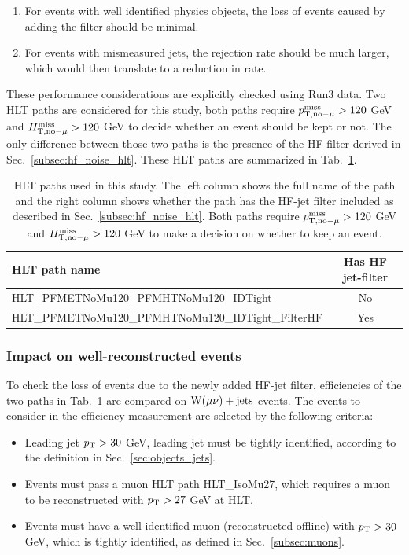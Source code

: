\begin{enumerate}
    \item For events with well identified physics objects, the loss of events caused by adding the filter should be minimal.
    \item For events with mismeasured jets, the rejection rate should be much larger, which would then translate to a reduction in rate.
\end{enumerate}

These performance considerations are explicitly checked using Run3 data. 
Two HLT paths are considered for this study, both paths require $p_{\textrm{T},\textrm{no}-\mu}^{\textrm{miss}} > 120$ GeV and $H_{\textrm{T},\textrm{no}-\mu}^{\textrm{miss}} > 120$ GeV
to decide whether an event should be kept or not. The only difference between those two paths is the presence of the HF-filter derived in Sec.~\ref{subsec:hf_noise_hlt}.
These HLT paths are summarized in Tab.~\ref{tab:hlt_met_paths}.

\begin{table}[h!]
    \centering
    \caption{HLT paths used in this study. The left column shows the full name of the path and the right column shows whether the path has
    the HF-jet filter included as described in Sec.~\ref{subsec:hf_noise_hlt}. Both paths require $p_{\textrm{T},\textrm{no}-\mu}^{\textrm{miss}} > 120$ GeV and $H_{\textrm{T},\textrm{no}-\mu}^{\textrm{miss}} > 120$ GeV
    to make a decision on whether to keep an event.}
    \label{tab:hlt_met_paths}
    \def\arraystretch{1.05}
    \begin{tabular}{l c}
        \hline
        HLT path name & Has HF jet-filter \\
        \hline
        HLT\_PFMETNoMu120\_PFMHTNoMu120\_IDTight           & No \\
        HLT\_PFMETNoMu120\_PFMHTNoMu120\_IDTight\_FilterHF & Yes \\
    \end{tabular}
\end{table}

\subsubsection{Impact on well-reconstructed events}

To check the loss of events due to the newly added HF-jet filter, efficiencies of the two paths in Tab.~\ref{tab:hlt_met_paths} are compared
on $\textrm{W}(\mu\nu)+\textrm{jets}$ events. The events to consider in the efficiency measurement are selected by the following criteria:

\begin{itemize}
    \item Leading jet $p_{\textrm{T}} > 30$ GeV, leading jet must be tightly identified, according to the definition in Sec.~\ref{sec:objects_jets}.
    \item Events must pass a muon HLT path HLT\_IsoMu27, which requires a muon to be reconstructed with $p_{\textrm{T}} > 27$ GeV at HLT.
    \item Events must have a well-identified muon (reconstructed offline) with $p_{\textrm{T}} > 30$ GeV, which is tightly identified, as defined in Sec.~\ref{subsec:muons}.
\end{itemize}

